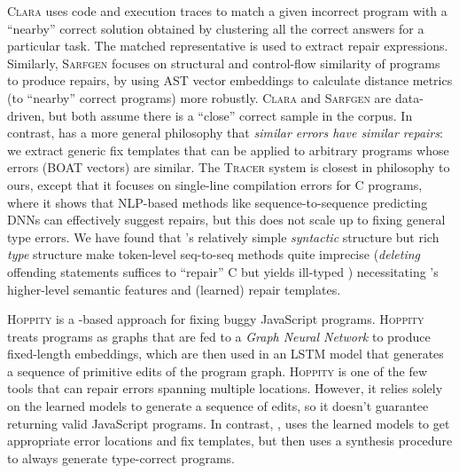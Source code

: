 %
\textsc{Clara} \citep{Gulwani_2018} uses code and execution traces to match a
given incorrect program with a ``nearby'' correct solution obtained by
clustering all the correct answers for a particular task. The matched
representative is used to extract repair expressions.
%
Similarly, \textsc{Sarfgen} \citep{Wang_2018} focuses on structural and
control-flow similarity of programs to produce repairs, by using AST vector
embeddings to calculate distance metrics (to ``nearby'' correct
programs) more robustly.
%
\textsc{Clara} and \textsc{Sarfgen} are data-driven, but both assume
there is a ``close'' correct sample in the corpus.
%
In contrast, \toolname has a more general philosophy that \emph{similar errors
have similar repairs}: we extract generic fix templates that can be applied to
arbitrary programs whose errors (BOAT vectors) are similar.
%
The \textsc{Tracer} system \citep{TRACER2018} is closest in philosophy to ours,
except that it focuses on single-line compilation errors for C programs, where
it shows that NLP-based methods like sequence-to-sequence predicting DNNs can
effectively suggest repairs, %
but this does not scale up to fixing general type errors.
%
We have found that \ocaml's relatively simple
\emph{syntactic} structure but rich \emph{type}
structure make token-level seq-to-seq methods
quite imprecise (\eg \emph{deleting} offending
statements suffices to ``repair'' C but yields
ill-typed \ocaml) necessitating \toolname's
higher-level semantic features and (learned)
repair templates.

\textsc{Hoppity} \citep{Dinella_2020} is
a \dnn-based approach for fixing buggy
JavaScript programs. \textsc{Hoppity}
treats programs as graphs that are fed
to a \emph{Graph Neural Network} to
produce fixed-length embeddings, which
are then used in an LSTM model that
generates a sequence of primitive
edits of the program graph.
%
\textsc{Hoppity} is one of the few tools
that can repair errors spanning multiple
locations. However, it relies solely on
the learned models to generate a sequence
of edits, so it doesn't guarantee returning
valid JavaScript programs.
%
In contrast, \toolname, uses the learned
models to get appropriate error locations
and fix templates, but then uses a synthesis
procedure to always generate type-correct programs.

